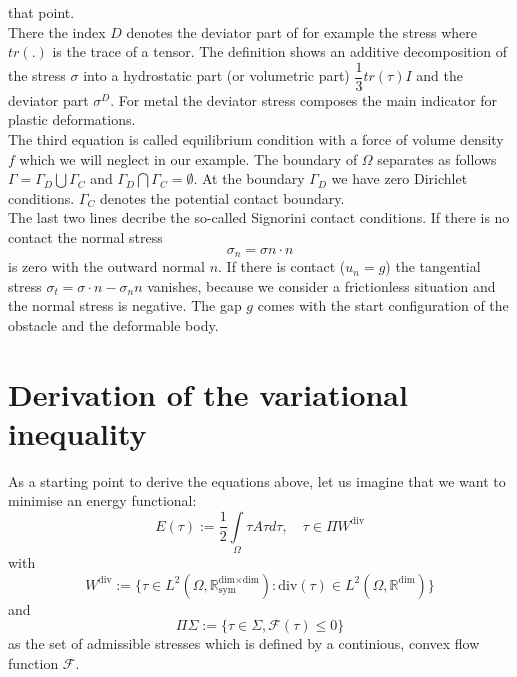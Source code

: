 \documentclass{article}
\begin{document}
that point.\\
There the index $D$ denotes the deviator part of for example the stress where
$tr(.)$ is the trace of a tensor. The definition shows an additive decomposition
of the stress $\sigma$ into a hydrostatic part (or volumetric part) $\dfrac{1}{3}tr(\tau)I$ and the deviator
part $\sigma^D$. For metal the deviator stress composes the main indicator for
plastic deformations.\\
The third equation is called equilibrium condition with a force of volume
density $f$ which we will neglect in our example.
The boundary of $\Omega$ separates as follows $\Gamma=\Gamma_D\bigcup\Gamma_C$ and $\Gamma_D\bigcap\Gamma_C=\emptyset$.
At the boundary $\Gamma_D$ we have zero Dirichlet conditions. $\Gamma_C$ denotes the potential contact boundary.\\
The last two lines decribe the so-called Signorini contact conditions. If there is no contact the normal  stress
$$ \sigma_n =  \sigma n\cdot n$$
is zero with the outward normal $n$. If there is contact ($u_n = g$) the tangential stress $\sigma_t = \sigma\cdot n - \sigma_n n$
vanishes, because we consider a frictionless situation and the normal stress is
negative. The gap $g$ comes with the start configuration of the obstacle and the
deformable body.

\section{Derivation of the variational inequality}

As a starting point to derive the equations above, let us imagine that we want
to minimise an energy functional:
$$E(\tau) := \dfrac{1}{2}\int\limits_{\Omega}\tau A \tau d\tau,\quad \tau\in \Pi W^{\textrm{div}}$$
with
$$W^{\textrm{div}}:=\lbrace \tau\in
L^2(\Omega,\mathbb{R}^{\textrm{dim}\times\textrm{dim}}_{\textrm{sym}}):\textrm{div}(\tau)\in L^2(\Omega,\mathbb{R}^{\textrm{dim}})\rbrace$$ and
$$\Pi \Sigma:=\lbrace \tau\in \Sigma, \mathcal{F}(\tau)\leq 0\rbrace$$
as the set of admissible stresses which is defined
by a continious, convex flow function $\mathcal{F}$.
\end{document}
